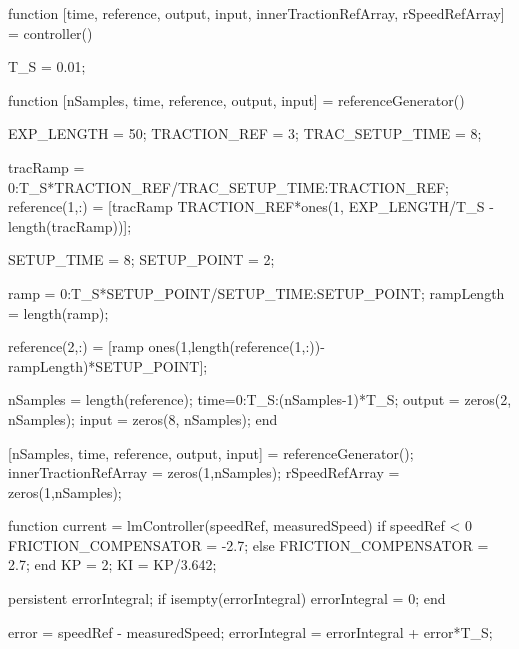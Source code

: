 \begin{matlabcode}
function [time, reference, output, input, innerTractionRefArray, rSpeedRefArray] = controller()


  T_S = 0.01;%


  function [nSamples, time, reference, output, input] = referenceGenerator()

    EXP_LENGTH = 50;%
    TRACTION_REF = 3;
    TRAC_SETUP_TIME = 8;

    tracRamp = 0:T_S*TRACTION_REF/TRAC_SETUP_TIME:TRACTION_REF;
    reference(1,:) = [tracRamp TRACTION_REF*ones(1, EXP_LENGTH/T_S - length(tracRamp))];

    SETUP_TIME = 8;%
    SETUP_POINT = 2;%

    ramp = 0:T_S*SETUP_POINT/SETUP_TIME:SETUP_POINT;
    rampLength = length(ramp);

    reference(2,:) = [ramp ones(1,length(reference(1,:))-rampLength)*SETUP_POINT];

    nSamples = length(reference);
    time=0:T_S:(nSamples-1)*T_S;
    output = zeros(2, nSamples);
    input = zeros(8, nSamples);
  end


  [nSamples, time, reference, output, input] = referenceGenerator();
  innerTractionRefArray = zeros(1,nSamples);
  rSpeedRefArray = zeros(1,nSamples);


  function current = lmController(speedRef, measuredSpeed)
    if speedRef < 0
      FRICTION_COMPENSATOR  = -2.7;
    else
      FRICTION_COMPENSATOR  = 2.7;
    end
    KP = 2;
    KI = KP/3.642;

    persistent errorIntegral;
    if isempty(errorIntegral)
      errorIntegral = 0;
    end

    error = speedRef - measuredSpeed;
    errorIntegral = errorIntegral + error*T_S;


\end{matlabcode}
